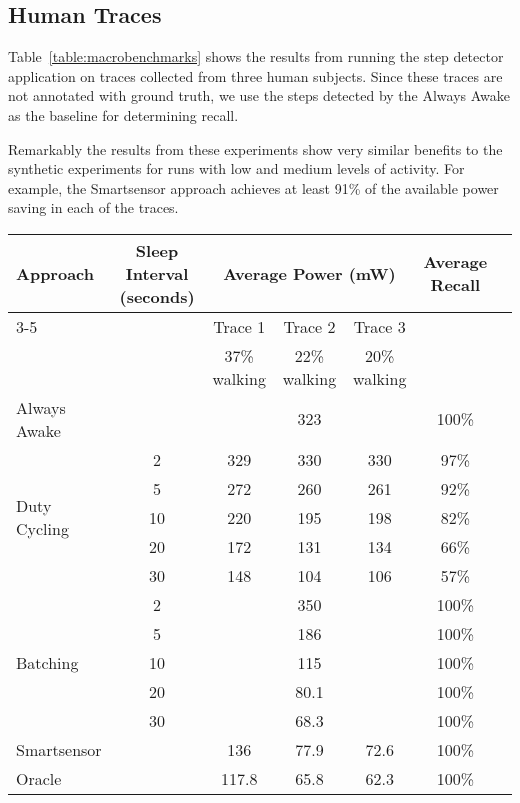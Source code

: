 \subsection{Human Traces}

Table~\ref{table:macrobenchmarks} shows the results from running the
step detector application on traces collected from three human
subjects.  Since these traces are not annotated with ground truth, we
use the steps detected by the Always Awake as the baseline for
determining recall.

Remarkably the results from these experiments show very similar
benefits to the synthetic experiments for runs with low and medium
levels of activity.  For example, the Smartsensor approach achieves
at least 91\% of the available power saving in each of the traces.

\begin{table*}[t]
\centering
{\small
    \begin{tabular}{|l|c|c|c|c|c|c|}
    \hline
	\multirow{2}{*}{Approach}		& \multirow{2}{*}{\parbox{2.2cm}{Sleep Interval (seconds)}}
												& \multicolumn{3}{c|}{\parbox{5.2cm}{Average Power (mW)}}
																								& \multirow{2}{*}{\parbox{1.5cm}{Average Recall}} \\ \cline{3-5}
									&			& Trace 1		& Trace 2		& Trace 3 		& 							\\ 
									&			& 37\% walking	& 22\% walking		& 20\% walking		& \\ \hline
	Always Awake					& 			& \multicolumn{3}{c|}{323} 						& 100\% \\ \hline
	\multirow{5}{*}{Duty Cycling}	& 2			& 329			& 330			& 330			& 97\%	\\ \cline{2-6}
									& 5			& 272			& 260			& 261			& 92\%	\\ \cline{2-6}
									& 10		& 220			& 195			& 198			& 82\%	\\ \cline{2-6}
									& 20		& 172			& 131			& 134			& 66\%	\\ \cline{2-6}
									& 30		& 148			& 104			& 106			& 57\%	\\ \hline
	\multirow{5}{*}{Batching}		& 2			& \multicolumn{3}{c|}{350} 						& 100\% \\ \cline{2-6}
									& 5			& \multicolumn{3}{c|}{186} 						& 100\% \\ \cline{2-6}
	 								& 10		& \multicolumn{3}{c|}{115} 						& 100\% \\ \cline{2-6}
	 								& 20		& \multicolumn{3}{c|}{80.1} 					& 100\% \\ \cline{2-6}
	 								& 30		& \multicolumn{3}{c|}{68.3} 					& 100\% \\ \hline
	Smartsensor				&			& 136			& 77.9			& 72.6			& 100\% \\ \hline
	Oracle				&			& 117.8			& 65.8			& 62.3			& 100\% \\ \hline



    \end{tabular}
}
	\caption{Event recall and average power for human traces.}
	\label{table:macrobenchmarks}
\end{table*}


